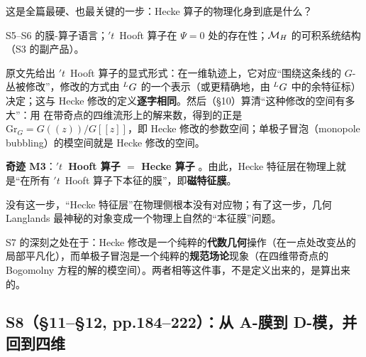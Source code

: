 \begin{description}[leftmargin=1.4em]
\item[要解决什么] 这是全篇最硬、也最关键的一步：Hecke 算子的物理化身到底是什么？
\item[输入] S5--S6 的膜-算子语言；$'t$~Hooft 算子在 $\Psi=0$ 处的存在性；$\mathcal{M}_H$ 的可积系统结构（S3 的副产品）。
\item[关键动作] 原文先给出 $'t$~Hooft 算子的显式形式：在一维轨迹上，它对应“围绕这条线的 $G$-丛被修改”，修改的方式由 ${}^{L}G$ 的一个表示（或更精确地，由 ${}^{L}G$ 中的余特征标）决定；这与 Hecke 修改的定义\textbf{逐字相同}。然后（\S10）算清“这种修改的空间有多大”：用 在带奇点的四维流形上的解来数，得到的正是  $\mathrm{Gr}_G=G((z))/G[[z]]$，即 Hecke 修改的参数空间；单极子冒泡（monopole bubbling）的模空间就是 Hecke 修改的空间。
\item[产出] \textbf{奇迹 M3}：\textbf{$'t$~Hooft 算子 $=$ Hecke 算子} \pA。由此，Hecke 特征层在物理上就是“在所有 $'t$~Hooft 算子下本征的膜”，即\textbf{磁特征膜}。
\item[为什么不可省] 没有这一步，“Hecke 特征层”在物理侧根本没有对应物；有了这一步，几何 Langlands 最神秘的对象变成一个物理上自然的“本征膜”问题。
\end{description}

\begin{keyidea}
S7 的深刻之处在于：Hecke 修改是一个纯粹的\textbf{代数几何}操作（在一点处改变丛的局部平凡化），而单极子冒泡是一个纯粹的\textbf{规范场论}现象（在四维带奇点的 Bogomolny 方程的解的模空间）。两者相等这件事，不是定义出来的，是算出来的。
\end{keyidea}

\subsection{S8（\S11--\S12, pp.184--222）：从 A-膜到 D-模，并回到四维}

